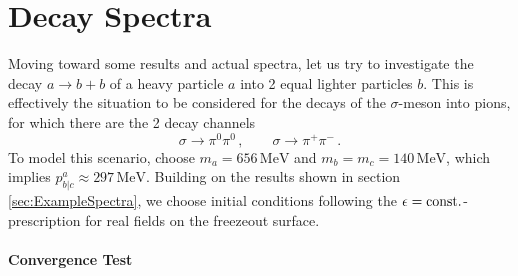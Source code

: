 
\section{Decay Spectra}

Moving toward some results and actual spectra, let us try to investigate the decay ${a\to b+b}$ of a heavy particle $a$ into 2 equal lighter particles $b$. This is effectively the situation to be considered for the decays of the $\sigma$-meson into pions, for which there are the 2 decay channels
\begin{equation}
    \sigma\to\pi^0\pi^0\,,\qquad\sigma\to\pi^+\pi^-\,.
\end{equation}
To model this scenario, choose ${m_a=656\,\text{MeV}}$ and ${m_b=m_c=140\,\text{MeV}}$, which implies ${p^a_{b\vert c}\approx 297\,\text{MeV}}$. Building on the results shown in section \ref{sec:ExampleSpectra}, we choose initial conditions following the $\epsilon={\text{const.}}$-prescription for real fields on the freezeout surface.

\paragraph{Convergence Test}

